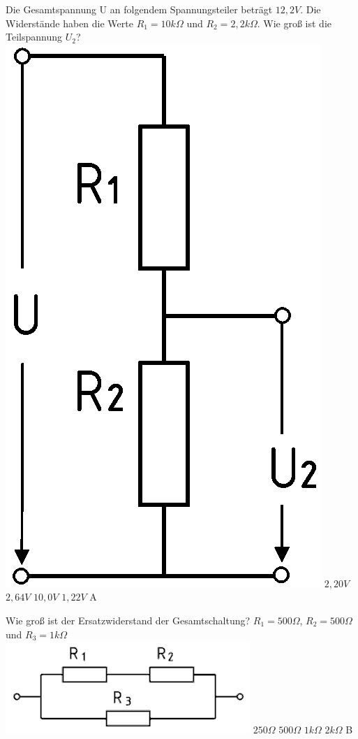 {Die Gesamtspannung U an folgendem Spannungsteiler beträgt $12,2V$. Die Widerstände haben die Werte $R_1 = 10k\Omega$ und $R_2 = 2,2k\Omega$. Wie groß ist die Teilspannung $U_2$?\\ \includegraphics[scale=0.15]{SSW/Bilder/Spannungsteiler.png}}%
{$2,20V$}%
{$2,64V$}%
{$10,0V$}%
{$1,22V$}%
{A}%

{Wie groß ist der Ersatzwiderstand der Gesamtschaltung? 
$R_1 = 500\Omega$, $R_2 = 500\Omega$ und $R_3 = 1k\Omega$\\ \includegraphics[scale=0.4]{SSW/Bilder/Parallelschaltung.png}}%
{$250\Omega$}%
{$500\Omega$}%
{$1k\Omega$}%
{$2k\Omega$}%
{B}%

